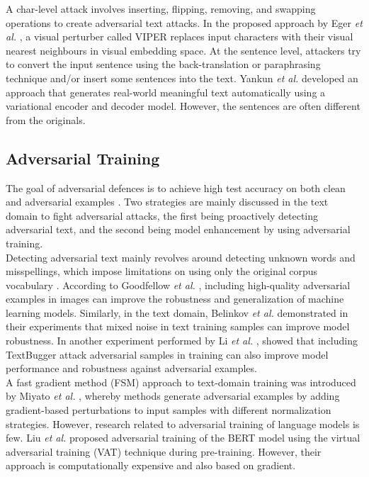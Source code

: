 \documentclass[%
	BCOR=8mm, %
	DIV=12,
	toc=bibliography, %
	toc=listof, %
	oneside, %
	egregdoesnotlikesansseriftitles, %
	]{scrbook}
\begin{document}
A char-level attack involves inserting, flipping, removing, and swapping operations to create adversarial text attacks. In the proposed approach by Eger \textit{et al.} \cite{eger_text_2019}, a visual perturber called VIPER replaces input characters with their visual nearest neighbours in visual embedding space.
At the sentence level, attackers try to convert the input sentence using the back-translation or paraphrasing technique and/or  insert some sentences into the text. Yankun \textit{et al.} \cite{ren_generating_2020}  developed an approach that generates real-world meaningful text automatically using a variational encoder and decoder model. However, the sentences are often different from the originals.

\subsection{Adversarial Training}
\label{subsection: adversarialtraining}
The goal of adversarial defences is to achieve high test accuracy on both clean and adversarial examples \cite{zhou_defense_2020}. Two strategies are mainly discussed in the text domain to fight adversarial attacks, the first being proactively detecting adversarial text, and the second being model enhancement by using adversarial training.\\
 Detecting adversarial text mainly revolves around detecting unknown words and misspellings, which impose limitations on using only the original corpus vocabulary \cite{wang_towards_2021}. 
According to Goodfellow \textit{et al.} \cite{goodfellow_explaining_2015}, including high-quality adversarial examples in images can improve the robustness and generalization of machine learning models. Similarly, in the text domain, Belinkov \textit{et al.}  \cite{belinkov_synthetic_2018} demonstrated in their experiments that mixed noise in text training samples can improve model robustness. In another experiment performed by Li \textit{et al.} \cite{li_textbugger_2019}, showed that including TextBugger attack adversarial samples in training can also improve model performance and robustness against adversarial examples.\\
A fast gradient method (FSM) approach to text-domain training was introduced by Miyato \textit{et al.} \cite{miyato_adversarial_2017}, whereby methods generate adversarial examples by adding gradient-based perturbations to input samples with different normalization strategies.
However, research related to adversarial training of language models is few. Liu \textit{et al.} \cite{liu_adversarial_2020} proposed adversarial training of the BERT model using the virtual adversarial training (VAT) technique \cite{miyato_virtual_2018}  during pre-training. However, their approach is computationally expensive and also based on gradient.\\
\end{document}
